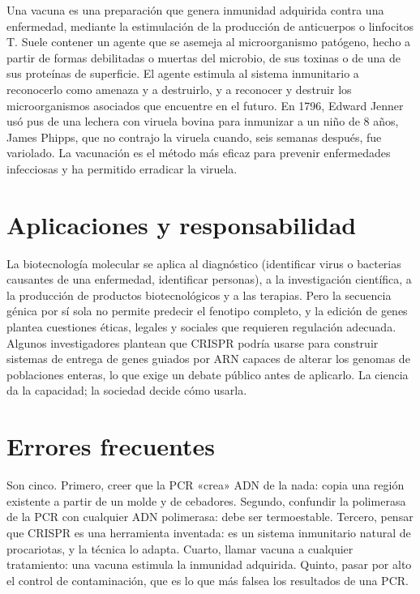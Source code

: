 \documentclass{book}
\begin{document}
Una vacuna es una preparación que genera inmunidad adquirida contra una enfermedad, mediante la estimulación de la producción de anticuerpos o linfocitos T. Suele contener un agente que se asemeja al microorganismo patógeno, hecho a partir de formas debilitadas o muertas del microbio, de sus toxinas o de una de sus proteínas de superficie. El agente estimula al sistema inmunitario a reconocerlo como amenaza y a destruirlo, y a reconocer y destruir los microorganismos asociados que encuentre en el futuro. En 1796, Edward Jenner usó pus de una lechera con viruela bovina para inmunizar a un niño de 8 años, James Phipps, que no contrajo la viruela cuando, seis semanas después, fue variolado. La vacunación es el método más eficaz para prevenir enfermedades infecciosas y ha permitido erradicar la viruela.


\section{Aplicaciones y responsabilidad}

La biotecnología molecular se aplica al diagnóstico (identificar virus o bacterias causantes de una enfermedad, identificar personas), a la investigación científica, a la producción de productos biotecnológicos y a las terapias. Pero la secuencia génica por sí sola no permite predecir el fenotipo completo, y la edición de genes plantea cuestiones éticas, legales y sociales que requieren regulación adecuada. Algunos investigadores plantean que CRISPR podría usarse para construir sistemas de entrega de genes guiados por ARN capaces de alterar los genomas de poblaciones enteras, lo que exige un debate público antes de aplicarlo. La ciencia da la capacidad; la sociedad decide cómo usarla.


\section{Errores frecuentes}

Son cinco. Primero, creer que la PCR «crea» ADN de la nada: copia una región existente a partir de un molde y de cebadores. Segundo, confundir la polimerasa de la PCR con cualquier ADN polimerasa: debe ser termoestable. Tercero, pensar que CRISPR es una herramienta inventada: es un sistema inmunitario natural de procariotas, y la técnica lo adapta. Cuarto, llamar vacuna a cualquier tratamiento: una vacuna estimula la inmunidad adquirida. Quinto, pasar por alto el control de contaminación, que es lo que más falsea los resultados de una PCR.
\end{document}
